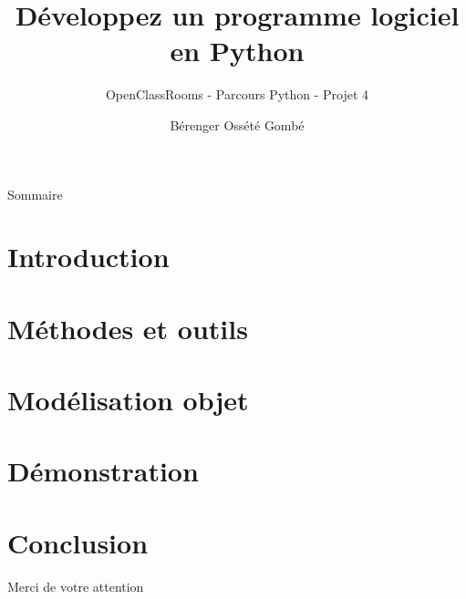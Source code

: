 \documentclass[pdf]{beamer}
\title{Développez un programme logiciel en Python}
\subtitle{OpenClassRooms - Parcours Python - Projet 4}
\author{Bérenger Ossété Gombé}
\begin{document}
\begin{frame}
  \titlepage
\end{frame}


\begin{frame}{Sommaire}
  \setcounter{tocdepth}{65536}
  \tableofcontents
\end{frame}

\section{Introduction}


\section{Méthodes et outils}


\section{Modélisation objet}


\section{Démonstration}


\section{Conclusion}


\begin{frame}{Merci de votre attention}
  \setcounter{tocdepth}{32}
  \tableofcontents
\end{frame}
\end{document}
